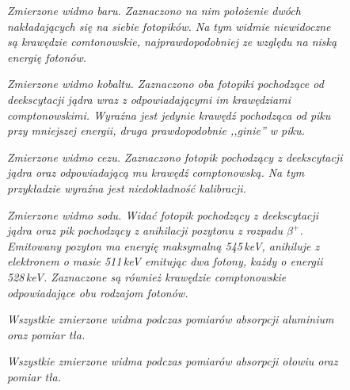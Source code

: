 \documentclass[10pt, twocolumn]{article}
\begin{document}
\begin{figure}
  \caption{\em Zmierzone widmo baru. Zaznaczono na nim położenie dwóch nakładających się na siebie fotopików. Na tym widmie niewidoczne są krawędzie comtonowskie, najprawdopodobniej ze względu na niską energię fotonów.}
  \label{ba133}
\end{figure}

\begin{figure}
  \caption{\em Zmierzone widmo kobaltu. Zaznaczono oba fotopiki pochodzące od deekscytacji jądra wraz z odpowiadającymi im krawędziami comptonowskimi. Wyraźna jest jedynie krawędź pochodząca od piku przy mniejszej energii, druga prawdopodobnie ,,ginie'' w piku.}
  \label{co60}
\end{figure}

\begin{figure}
  \caption{\em Zmierzone widmo cezu. Zaznaczono fotopik pochodzący z deekscytacji jądra oraz odpowiadającą mu krawędź comptonowską. Na tym przykładzie wyraźna jest niedokładność kalibracji.}
  \label{cs137}
\end{figure}

\begin{figure}
  \caption{\em Zmierzone widmo sodu. Widać fotopik pochodzący z deekscytacji jądra oraz pik pochodzący z anihilacji pozytonu z rozpadu $\beta^+$. Emitowany pozyton ma energię maksymalną 545$\,$keV, anihiluje z elektronem o masie 511$\,$keV emitując dwa fotony, każdy o energii 528$\,$keV. Zaznaczone są również krawędzie comptonowskie odpowiadające obu rodzajom fotonów.}
  \label{na22}
\end{figure}

\begin{figure}
  \caption{\em Wszystkie zmierzone widma podczas pomiarów absorpcji aluminium oraz pomiar tła.}
  \label{wszystkie_al}
\end{figure}

\begin{figure}
  \caption{\em Wszystkie zmierzone widma podczas pomiarów absorpcji ołowiu oraz pomiar tła.}
  \label{wszystkie_pb}
\end{figure}
\end{document}

